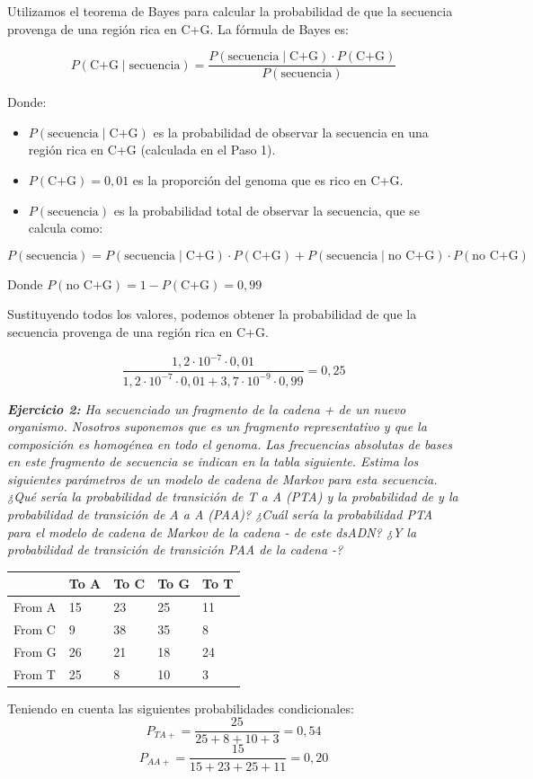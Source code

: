 \begin{itemize}
Utilizamos el teorema de Bayes para calcular la probabilidad de que la secuencia provenga de una región rica en C+G. La fórmula de Bayes es:

\[
P(\text{C+G} \mid \text{secuencia}) = \frac{P(\text{secuencia} \mid \text{C+G}) \cdot P(\text{C+G})}{P(\text{secuencia})}
\]

Donde:
\begin{itemize}
\item $ P(\text{secuencia} \mid \text{C+G}) $ es la probabilidad de observar la secuencia en una región rica en C+G (calculada en el Paso 1).
\item $ P(\text{C+G}) = 0,01 $ es la proporción del genoma que es rico en C+G.
\item $ P(\text{secuencia}) $ es la probabilidad total de observar la secuencia, que se calcula como:
\end{itemize}

\[
P(\text{secuencia}) = P(\text{secuencia} \mid \text{C+G}) \cdot P(\text{C+G}) + P(\text{secuencia} \mid \text{no C+G}) \cdot P(\text{no C+G})
\]

Donde $ P(\text{no C+G}) = 1 - P(\text{C+G}) = 0,99 $

Sustituyendo todos los valores, podemos obtener la probabilidad de que la secuencia provenga de una región rica en C+G.

\[
\frac{1,2 \cdot 10^{-7} \cdot 0,01}{1,2 \cdot 10^{-7} \cdot 0,01 + 3,7 \cdot 10^{-9} \cdot 0,99} = 0,25
\]

\end{itemize}

\textit{\textbf{Ejercicio 2:} 
Ha secuenciado un fragmento de la cadena + de un nuevo organismo. Nosotros suponemos que es un fragmento representativo y que la composición es homogénea en todo el genoma. Las frecuencias absolutas de bases en este fragmento de secuencia se indican en la tabla siguiente. Estima los siguientes parámetros de un modelo de cadena de Markov para esta secuencia. ¿Qué sería la probabilidad de transición de T a A (PTA) y la probabilidad de y la probabilidad de transición de A a A (PAA)? ¿Cuál sería la probabilidad PTA para el modelo de cadena de Markov de la cadena - de este dsADN? ¿Y la probabilidad de transición de transición PAA de la cadena -?}
\begin{table}[htbp]
    \centering
    \begin{tabularx}{\textwidth}{ X | X X X X}
          & To A & To C & To G & To T \\ \hline
         From A & 15 & 23 & 25 & 11 \\
         From C & 9 & 38 & 35 & 8 \\
         From G & 26 & 21 & 18 & 24 \\
         From T & 25 & 8 & 10 & 3 \\
    \end{tabularx}
\end{table}
Teniendo en cuenta las siguientes probabilidades condicionales:
$$P_{TA+} = \frac{25}{25 + 8 + 10 + 3} = 0,54 $$
$$P_{AA+} = \frac{15}{15 + 23 + 25 + 11} = 0,20 $$

